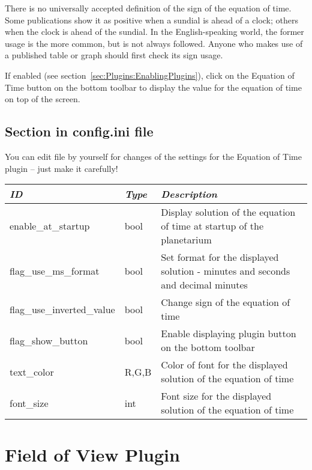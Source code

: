 There is no universally accepted definition of the sign of the
equation of time. Some publications show it as positive when a sundial
is ahead of a clock; others when the clock is ahead of the sundial. In
the English-speaking world, the former usage is the more common, but
is not always followed. Anyone who makes use of a published table or
graph should first check its sign usage.

If enabled (see section~\ref{sec:Plugins:EnablingPlugins}), click on
the Equation of Time button 
on the bottom toolbar to display the value for the equation of time on
top of the screen.


\subsection{Section  in config.ini file}
\label{sec:plugins:EquationOfTime:config}

You can edit  file by yourself for changes of the
settings for the Equation of Time plugin -- just make it carefully!

\begin{longtabu} to \textwidth {l|l|X}\toprule
\emph{ID}            & \emph{Type} & \emph{Description}\\\midrule
enable\_at\_startup  & bool & Display solution of the equation of time at startup of the planetarium\\\midrule
flag\_use\_ms\_format & bool & Set format for the displayed solution - minutes and seconds and decimal minutes\\\midrule
flag\_use\_inverted\_value & bool & Change sign of the equation of time \\\midrule
flag\_show\_button & bool & Enable displaying plugin button on the bottom toolbar\\\midrule
text\_color & R,G,B & Color of font for the displayed solution of the equation of time\\\midrule
font\_size & int & Font size for the displayed solution of the equation of time \\\bottomrule
\end{longtabu}



\newpage

\section{Field of View Plugin}
\label{sec:plugins:FieldOfView}

